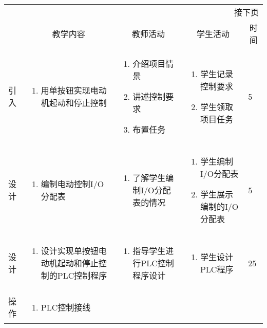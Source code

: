 {\begin{landscape}
\begin{longtable}{|m{10mm}|m{50mm}|m{50mm}|m{50mm}|m{15mm}|}
\multicolumn{5}{r}{\small 接下页}\\
\endfoot
\hline
\endlastfoot
\multicolumn{1}{|c|}{步骤}&\multicolumn{1}{c|}{教学内容}&\multicolumn{1}{c|}{教师活动}&\multicolumn{1}{c|}{学生活动}&\multicolumn{1}{c|}{时间}\\\hline
引入&\begin{enumerate}
\item 用单按钮实现电动机起动和停止控制
\end{enumerate} &\begin{enumerate}
\item 介绍项目情景
\item 讲述控制要求
\item 布置任务
\end{enumerate} &\begin{enumerate}
\item 学生记录控制要求
\item 学生领取项目任务
\end{enumerate} &5 \\\hline
设计&
\begin{enumerate}
\item 编制电动控制I/O分配表
\end{enumerate} &\begin{enumerate}
\item 了解学生编制I/O分配表的情况
\end{enumerate} &\begin{enumerate}
\item 学生编制I/O分配表
\item 学生展示编制的I/O分配表
\end{enumerate} &5 \\\hline
设计&\begin{enumerate}
\item 设计实现单按钮电动机起动和停止控制的PLC控制程序
\end{enumerate}
&\begin{enumerate}
\item 指导学生进行PLC控制程序设计
\end{enumerate} &\begin{enumerate}
\item 学生设计PLC程序
\end{enumerate} &25 \\\hline
操作&
\begin{enumerate}
\item PLC控制接线
\end{enumerate} &\begin{enumerate}

\end{enumerate}
\end{longtable}
\end{landscape}}
